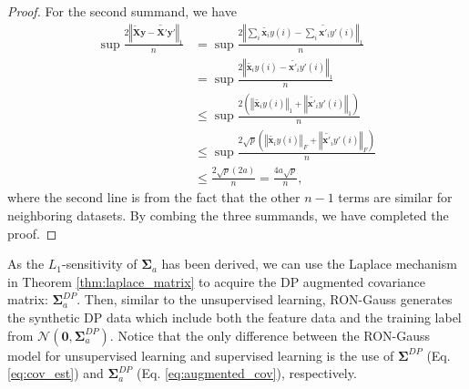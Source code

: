 \documentclass[USenglish,oneside,twocolumn]{article}
\theoremstyle{definition}
\theoremstyle{remark}
\theoremstyle{plain}
\theoremstyle{plain}
\begin{document}
\begin{proof}
For the second summand, we have
\begin{align*}
\sup\frac{2\left\Vert \widetilde{\mathbf{X}}\mathbf{y}-\widetilde{\mathbf{X}'}\mathbf{y}'\right\Vert _{1}}{n}
 & =\sup\frac{2\left\Vert \sum_{i}\widetilde{\mathbf{x}_{i}}y(i)-\sum_{i}\widetilde{\mathbf{x}'_{i}}y'(i)\right\Vert _{1}}{n}\\
 & =\sup\frac{2\left\Vert \widetilde{\mathbf{x}_{i}}y(i)-\widetilde{\mathbf{x}'_{i}}y'(i)\right\Vert _{1}}{n}\\
 & \leq\sup\frac{2(\left\Vert \widetilde{\mathbf{x}_{i}}y(i)\right\Vert _{1}+\left\Vert \widetilde{\mathbf{x}'_{i}}y'(i)\right\Vert _{1})}{n}\\
 & \leq\sup\frac{2\sqrt{p}(\left\Vert \widetilde{\mathbf{x}_{i}}y(i)\right\Vert _{F}+\left\Vert \widetilde{\mathbf{x}'_{i}}y'(i)\right\Vert _{F})}{n}\\
 & \leq\frac{2\sqrt{p}(2a)}{n}=\frac{4a\sqrt{p}}{n},
\end{align*}
where the second line is from the fact that the other $n-1$ terms
are similar for neighboring datasets. By combing the three summands,
we have completed the proof. 
\end{proof}
%
As the $L_{1}$-sensitivity of $\boldsymbol{\Sigma}_{a}$ has been
derived, we can use the Laplace mechanism in Theorem \ref{thm:laplace_matrix}
to acquire the DP augmented covariance matrix: $\boldsymbol{\Sigma}_{a}^{DP}$.
Then, similar to the unsupervised learning, RON-Gauss generates the
synthetic DP data \textendash{} which include both the feature data
and the training label \textendash{} from $\mathcal{N}(\mathbf{0},\boldsymbol{\Sigma}_{a}^{DP})$.
Notice that the only difference between the RON-Gauss model for unsupervised
learning and supervised learning is the use of $\boldsymbol{\Sigma}^{DP}$
(Eq. \eqref{eq:cov_est}) and $\boldsymbol{\Sigma}_{a}^{DP}$ (Eq.
\eqref{eq:augmented_cov}), respectively.
\end{document}
